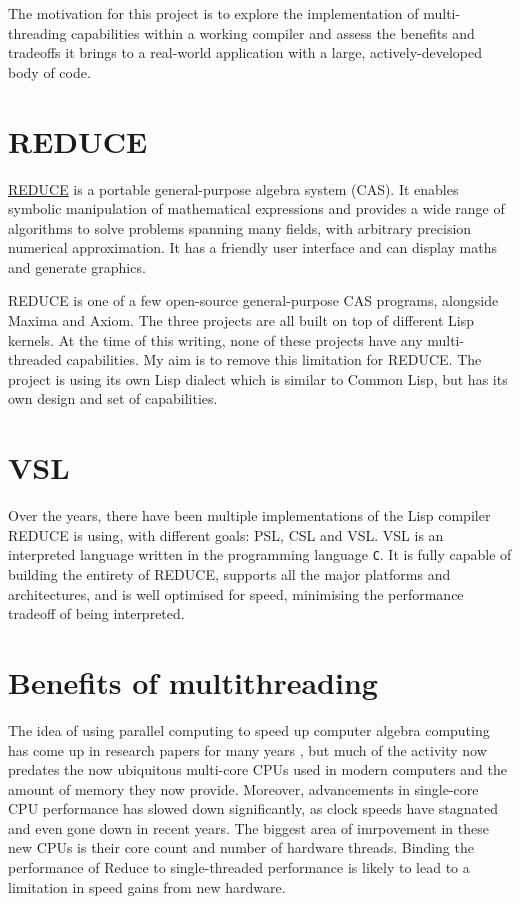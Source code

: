 The motivation for this project is to explore the implementation of multi-threading
capabilities within a working compiler and assess the benefits and tradeoffs it brings
to a real-world application with a large, actively-developed body of code.

\section{REDUCE}
\label{sec:orgf1701db}

\href{https://reduce-algebra.sourceforge.io/}{REDUCE} \cite{reduce} is a portable general-purpose algebra system (CAS). It enables symbolic
manipulation of mathematical expressions and provides a wide range of algorithms
to solve problems spanning many fields, with arbitrary precision numerical approximation.
It has a friendly user interface and can display maths and generate graphics.

REDUCE is one of a few open-source general-purpose CAS programs, alongside Maxima and Axiom.
The three projects are all built on top of different Lisp kernels. At the time of this writing,
none of these projects have any multi-threaded capabilities. My aim is to remove this limitation
for REDUCE. The project is using its own Lisp dialect which is similar to Common Lisp, but has its
own design and set of capabilities.

\section{VSL}
\label{sec:org0f33bda}

Over the years, there have been multiple implementations of the Lisp compiler REDUCE is using, with
different goals: PSL, CSL and VSL. VSL is an interpreted language written in the programming
language \texttt{C}. It is fully capable of building the entirety of REDUCE, supports all the major
platforms and architectures, and is well optimised for speed, minimising the performance tradeoff
of being interpreted.

\section{Benefits of multithreading}
\label{sec:org5d57a0b}

The idea of using parallel computing to speed up computer algebra computing has come
up in research papers for many years \cite{multithreading}, but much of the activity now
predates the now ubiquitous multi-core CPUs used in modern computers and the amount of memory
they now provide. Moreover, advancements in single-core CPU performance has slowed down
significantly, as clock speeds have stagnated and even gone down in recent years. The biggest
area of imrpovement in these new CPUs is their core count and number of hardware threads.
Binding the performance of Reduce to single-threaded performance is likely to lead to
a limitation in speed gains from new hardware.

